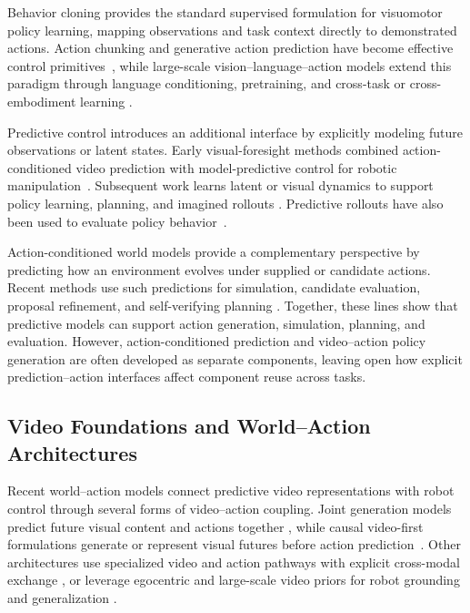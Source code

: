 Behavior cloning provides the standard supervised formulation for visuomotor
policy learning, mapping observations and task context directly to demonstrated
actions. Action chunking and generative action prediction have become effective
control primitives~\cite{zhao2023learning, chi2025diffusion}, while large-scale
vision--language--action models extend this paradigm through language
conditioning, pretraining, and cross-task or cross-embodiment learning
\cite{brohan2022rt, brohan2023rt, kim2024openvla, black2024pi_0,
intelligence2025pi_, o2024open, team2024octo}.

Predictive control introduces an additional interface by explicitly modeling
future observations or latent states. Early visual-foresight methods combined
action-conditioned video prediction with model-predictive control for robotic
manipulation~\cite{finn2017deep,ebert2018visual}. Subsequent work learns latent
or visual dynamics to support policy learning, planning, and imagined rollouts
\cite{hafner2019dream, hafner2023mastering, wu2023daydreamer,
wu2024unleashing, cheang2024gr, zhou2024robodreamer}. Predictive rollouts have also been used to evaluate policy behavior~\cite{li2025worldeval, guo2026ctrl}.

Action-conditioned world models provide a complementary perspective by
predicting how an environment evolves under supplied or candidate actions.
Recent methods use such predictions for simulation, candidate evaluation,
proposal refinement, and self-verifying planning
\cite{huang2026learning, zhou2026tau_0, qi2026inference,
zhang2026worldcoherent}. Together, these lines show that predictive models can
support action generation, simulation, planning, and evaluation. However,
action-conditioned prediction and video--action policy generation are often
developed as separate components, leaving open how explicit
prediction--action interfaces affect component reuse across tasks.

\subsection{Video Foundations and World--Action Architectures}

Recent world--action models connect predictive video representations with
robot control through several forms of video--action coupling. Joint
generation models predict future visual content and actions together
\cite{ye2026world, cosmos3, shen2026videovla, guo2024prediction}, while
causal video-first formulations generate or represent visual futures before
action prediction~\cite{li2026causal, rhoda2026dva}. Other architectures use
specialized video and action pathways with explicit cross-modal exchange
\cite{yang2026covar, zhang2026deva}, or leverage egocentric and large-scale
video priors for robot grounding and generalization
\cite{li2026egowam, zhou2026zero, wu2026zimablue, qiu2026vid2wam}.

